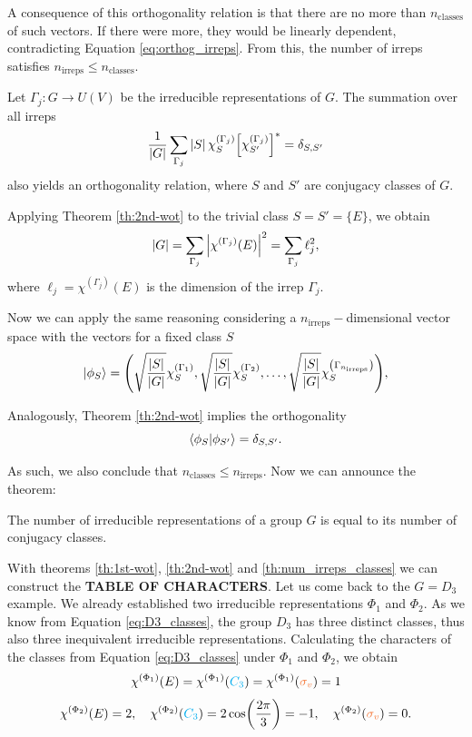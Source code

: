 A consequence of this orthogonality relation is that there are no more than $n_{\text{classes}}$ of such vectors. If there were more, they would be linearly dependent, contradicting Equation \ref{eq:orthog_irreps}. From this, the number of irreps satisfies $n_{\text{irreps}} \leq n_{\text{classes}}$.

\begin{theorem} \label{th:2nd-wot}
Let $\Gamma_j: G \to U(V)$ be the irreducible representations of $G$. The summation over all irreps
\begin{equation} \label{eq:2nd-wot}
\frac{1}{\abs{G}} \sum_{\Gamma_j} \abs{S} \, \chi^{(\Gamma_j)}_S \qty[\chi^{(\Gamma_j)}_{S'}]^* = \delta_{S, S'}
\end{equation}
also yields an orthogonality relation, where $S$ and $S'$ are conjugacy classes of $G$.
\end{theorem}

\begin{corollary} \label{coro:chi_E}
Applying Theorem \ref{th:2nd-wot} to the trivial class $S = S' = \{E\}$, we obtain
\begin{equation} \label{eq:chi_E_coro}
\abs{G} = \sum_{\Gamma_j} \abs{\chi^{(\Gamma_j)}(E)}^2 = \sum_{\Gamma_j} \ell_j^2,
\end{equation}
where $\ell_j = \chi^{(\Gamma_j)}(E)$ is the dimension of the irrep $\Gamma_j$.
\end{corollary}

Now we can apply the same reasoning considering a $n_{\text{irreps}}-$dimensional vector space with the vectors for a fixed class $S$
$$
\ket{\phi_{S}} =
\qty(
\sqrt{\frac{\abs{S}}{\abs{G}}} \chi^{(\Gamma_1)}_{S},
\sqrt{\frac{\abs{S}}{\abs{G}}} \chi^{(\Gamma_2)}_{S},
\ldots,
\sqrt{\frac{\abs{S}}{\abs{G}}} \chi^{\qty(\Gamma_{n_{\text{irreps}}})}_{S}
),
$$

Analogously, Theorem \ref{th:2nd-wot} implies the orthogonality
$$
\braket{\phi_{S}}{\phi_{S'}} = \delta_{S, S'}.
$$

As such, we also conclude that $n_{\text{classes}} \leq n_{\text{irreps}}$. Now we can announce the theorem:

\begin{theorem}[$\bm{n_{\textbf{irreps}} = n_{\textbf{classes}}}$] \label{th:num_irreps_classes}
The number of irreducible representations of a group $G$ is equal to its number of conjugacy classes.
\end{theorem}

With theorems \ref{th:1st-wot}, \ref{th:2nd-wot} and \ref{th:num_irreps_classes} we can construct the \textbf{TABLE OF CHARACTERS}. Let us come back to the $G = D_3$ example. We already established two irreducible representations $\Phi_1$ and $\Phi_2$. As we know from Equation \ref{eq:D3_classes}, the group $D_3$ has three distinct classes, thus also three inequivalent irreducible representations. Calculating the characters of the classes from Equation \ref{eq:D3_classes} under $\Phi_1$ and $\Phi_2$, we obtain
$$
\chi^{(\Phi_1)}(E) = \chi^{(\Phi_1)}(\Ct) = \chi^{(\Phi_1)}(\sv) = 1
$$
$$
\chi^{(\Phi_2)}(E) = 2, \quad \chi^{(\Phi_2)}(\Ct) = 2 \cos(\frac{2\pi}{3}) = -1, \quad \chi^{(\Phi_2)}(\sv) = 0.
$$

